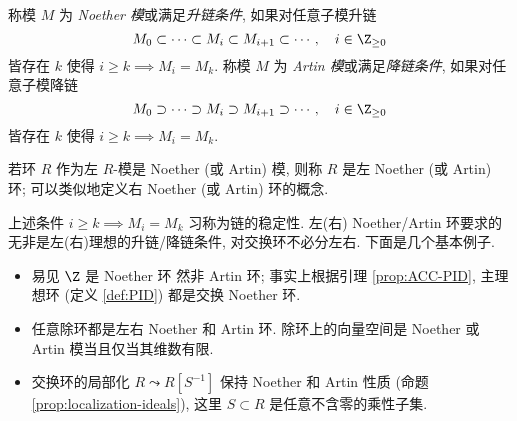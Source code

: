 \begin{definition}\label{def:ACC-DCC-mod}
	称模 $M$ 为 \emph{Noether 模}或满足\emph{升链条件}, 如果对任意子模升链
	$$ M_0 \subset \cdots \subset M_i \subset M_{i+1} \subset \cdots, \quad i \in \Z_{\geq 0} $$
	皆存在 $k$ 使得 $i \geq k \implies M_i = M_k$. 称模 $M$ 为 \emph{Artin 模}或满足\emph{降链条件}, 如果对任意子模降链
	$$ M_0 \supset \cdots \supset M_i \supset M_{i+1} \supset \cdots, \quad i \in \Z_{\geq 0} $$
	皆存在 $k$ 使得 $i \geq k \implies M_i = M_k$.
	
	若环 $R$ 作为左 $R$-模是 Noether (或 Artin) 模, 则称 $R$ 是左 Noether (或 Artin) 环; 可以类似地定义右 Noether (或 Artin) 环的概念.
\end{definition}
上述条件 $i \geq k \implies M_i = M_k$ 习称为链的稳定性. 左(右) Noether/Artin 环要求的无非是左(右)理想的升链/降链条件, 对交换环不必分左右. 下面是几个基本例子.
\begin{itemize}
	\item 易见 $\Z$ 是 Noether 环 然非 Artin 环; 事实上根据引理 \ref{prop:ACC-PID}, 主理想环 (定义 \ref{def:PID}) 都是交换 Noether 环.
	\item 任意除环都是左右 Noether 和 Artin 环. 除环上的向量空间是 Noether 或 Artin 模当且仅当其维数有限.
	\item 交换环的局部化 $R \leadsto R[S^{-1}]$ 保持 Noether 和 Artin 性质 (命题 \ref{prop:localization-ideals}), 这里 $S \subset R$ 是任意不含零的乘性子集.
\end{itemize}

